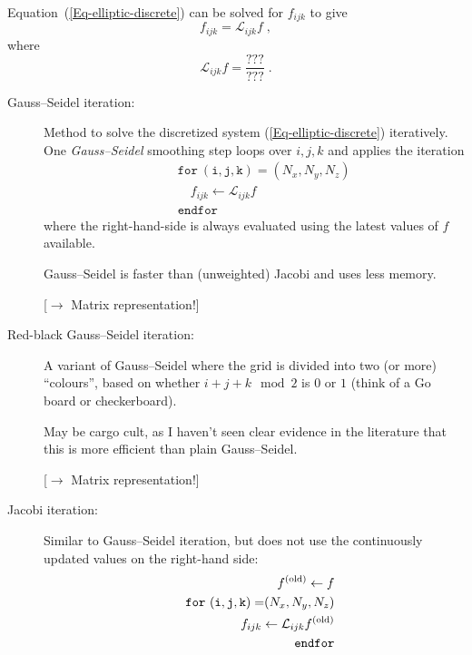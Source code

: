 \documentclass[\mydriver,12pt,twoside,notitlepage,letterpaper]{article}
\begin{document}
Equation~(\ref{Eq-elliptic-discrete}) can be solved for $f_{ijk}$ to give
\begin{equation}
  \label{Eq-discrete-explicit}
  f_{ijk} = \mathcal{L}_{ijk} f \; , 
\end{equation}
where
\begin{equation}
  \mathcal{L}_{ijk} f
  = \dfrac{???}
          {???} \; .
\end{equation}


\begin{description}

\item[Gauss--Seidel iteration:]
  Method to solve the discretized system
  (\ref{Eq-elliptic-discrete}) iteratively.
  One \emph{Gauss--Seidel} smoothing step loops over $i,j,k$ and applies
  the iteration
  \begin{eqnarray}
    \label{Eq-Gauss-Seidel}
    && \mathtt{for\ (i,j,k)=}(N_x,N_y,N_z) \nonumber\\
    && \quad f_{ijk} \leftarrow \mathcal{L}_{ijk} f\\
    && \mathtt{endfor} \nonumber
  \end{eqnarray}
  where the right-hand-side is always evaluated using the latest values of
  $f$ available.

  Gauss--Seidel is faster than (unweighted) Jacobi and uses less memory.

  [$\rightarrow$ Matrix representation!]

\item[Red-black Gauss--Seidel iteration:]
  A variant of Gauss--Seidel where the grid is divided into two (or more)
  ``colours'', based on whether $i+j+k \mod 2$ is $0$ or $1$ (think of a
  Go board or checkerboard).

  May be cargo cult, as I haven't seen clear evidence in the literature
  that this is more efficient than plain Gauss--Seidel.

  [$\rightarrow$ Matrix representation!]

\item[Jacobi iteration:]
  Similar to Gauss--Seidel iteration, but does not use the continuously
  updated values on the right-hand side:
  \begin{eqnarray}
    \label{Eq-Jacobi}
    && f^{\rm(old)} \leftarrow f \nonumber\\
    && \mathtt{for\ (i,j,k)=}(N_x,N_y,N_z) \nonumber\\
    && \quad f_{ijk} \leftarrow \mathcal{L}_{ijk} f^{\rm(old)} \\
    && \mathtt{endfor} \nonumber\\
  \end{eqnarray}


\end{description}
\end{document}
